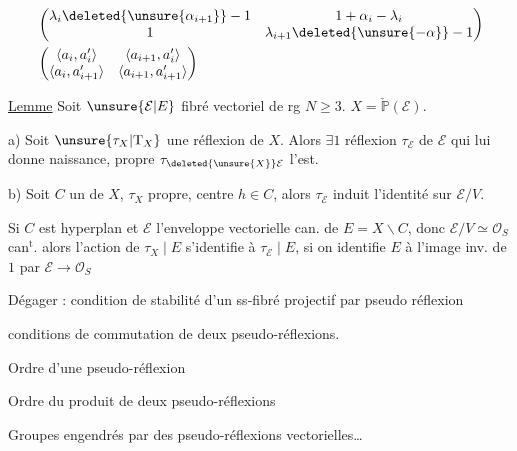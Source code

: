 \[
\begin{aligned}
&\begin{pmatrix}\lambda_i\deleted{\unsure{\alpha_{i+1}}}-1&1+\alpha_i-\lambda_i\\1&\lambda_{i+1}\deleted{\unsure{-\alpha}}-1\end{pmatrix}\\
&\begin{pmatrix}\langle a_i,a'_i\rangle&\langle a_{i+1},a'_i\rangle\\
\langle a_i,a'_{i+1}\rangle&\langle a_{i+1},a'_{i+1}\rangle\end{pmatrix}
\end{aligned}
\]


\uline{Lemme} Soit $\unsure{\mathcal E|E}$ fibré vectoriel de rg $N\geq3$. $X=\check{\mathbb P}(\mathcal E)$.

a) Soit $\unsure{\tau_X|\mathrm T_X}$ une réflexion de $X$. Alors $\exists1$ réflexion $\tau_{\mathcal E}$ de $\mathcal E$ qui lui donne naissance, propre  $\tau_{\deleted{\unsure{X}}\mathcal E}$ l'est.

b) Soit $C$ un   de $X$,    $\tau_X$ propre, centre $h\in C$,  alors  $\tau_{\mathcal E}$ induit l'identité sur $\mathcal E/V$.

Si $C$ est hyperplan et $\mathcal E$ l'enveloppe vectorielle can. de $E=X\smallsetminus C$, donc $\mathcal E/V\simeq\mathcal O_S$ can$^{\mathrm t}$. alors l'action de $\tau_X\mid E$  s'identifie à $\tau_{\mathcal E}\mid E$, si on identifie $E$ à l'image inv. de $1$ par $\mathcal E\longrightarrow\mathcal O_S$

Dégager : condition de stabilité d'un ss-fibré projectif par pseudo réflexion

conditions de commutation de deux pseudo-réflexions.

Ordre d'une pseudo-réflexion

Ordre du produit de deux pseudo-réflexions


Groupes engendrés par des pseudo-réflexions vectorielles\ldots

